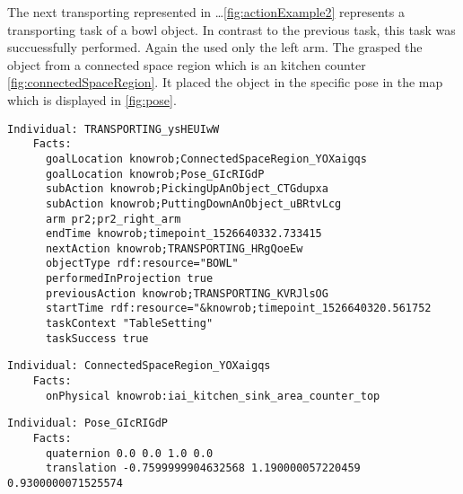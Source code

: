 	The next transporting represented in \dots \ref{fig:actionExample2} represents a transporting task of a bowl object.
	In contrast to the previous task, this task was succuessfully performed.
	Again the \pr used only the left arm.
	The \pr grasped the object from a connected space region which is an kitchen counter \ref{fig:connectedSpaceRegion}.
	It placed the object in the specific pose in the map which is displayed in \ref{fig:pose}.
	

\begin{minipage}{\textwidth}
\scriptsize
\begin{lstlisting}[frame=single]
  Individual: TRANSPORTING_ysHEUIwW
	Facts: 
	  goalLocation knowrob;ConnectedSpaceRegion_YOXaigqs
	  goalLocation knowrob;Pose_GIcRIGdP
	  subAction knowrob;PickingUpAnObject_CTGdupxa
      subAction knowrob;PuttingDownAnObject_uBRtvLcg
      arm pr2;pr2_right_arm
      endTime knowrob;timepoint_1526640332.733415
      nextAction knowrob;TRANSPORTING_HRgQoeEw
      objectType rdf:resource="BOWL"
      performedInProjection true
      previousAction knowrob;TRANSPORTING_KVRJlsOG
      startTime rdf:resource="&knowrob;timepoint_1526640320.561752
	  taskContext "TableSetting"
	  taskSuccess true
\end{lstlisting}
\vspace{2mm}
\label{fig:actionExample2}
\end{minipage}


\begin{minipage}{\textwidth}
	\scriptsize
\begin{lstlisting}[frame=single]
  Individual: ConnectedSpaceRegion_YOXaigqs
	Facts: 
	  onPhysical knowrob:iai_kitchen_sink_area_counter_top
\end{lstlisting}
	\vspace{2mm}
	\label{fig:connectedSpaceRegion}
\end{minipage}


\begin{minipage}{\textwidth}
	\scriptsize
\begin{lstlisting}[frame=single]
  Individual: Pose_GIcRIGdP
    Facts: 
	  quaternion 0.0 0.0 1.0 0.0
	  translation -0.7599999904632568 1.190000057220459 0.9300000071525574
\end{lstlisting}
	\vspace{2mm}
	\label{fig:pose}
\end{minipage}
